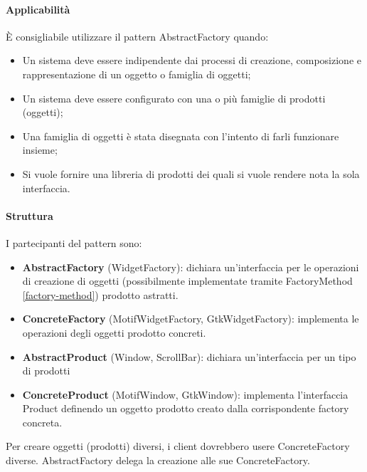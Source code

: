 \paragraph{Applicabilità} È consigliabile utilizzare il pattern AbstractFactory quando:
\begin{itemize}
    \item Un sistema deve essere indipendente dai processi di creazione, composizione e rappresentazione di un oggetto o famiglia di oggetti;
    \item Un sistema deve essere configurato con una o più famiglie di prodotti (oggetti);
    \item Una famiglia di oggetti è stata disegnata con l'intento di farli funzionare insieme;
    \item Si vuole fornire una libreria di prodotti dei quali si vuole rendere nota la sola interfaccia.
\end{itemize}

\paragraph{Struttura} I partecipanti del pattern sono:
\begin{itemize}
    \item \textbf{AbstractFactory} (WidgetFactory): dichiara un’interfaccia per le operazioni di creazione di oggetti (possibilmente implementate tramite FactoryMethod \ref{factory-method}) prodotto astratti.
    \item \textbf{ConcreteFactory} (MotifWidgetFactory, GtkWidgetFactory): implementa le operazioni degli oggetti prodotto concreti.
    \item \textbf{AbstractProduct} (Window, ScrollBar): dichiara un’interfaccia per un tipo di prodotti
    \item \textbf{ConcreteProduct} (MotifWindow, GtkWindow): implementa l’interfaccia Product definendo un oggetto prodotto creato dalla corrispondente factory concreta.
\end{itemize}

Per creare oggetti (prodotti) diversi, i client dovrebbero usere ConcreteFactory diverse.
AbstractFactory delega la creazione alle sue ConcreteFactory.

